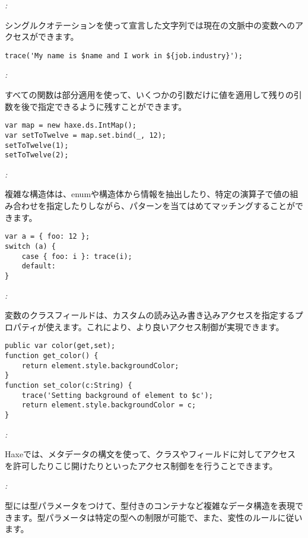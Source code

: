 \emph{:}

シングルクオテーションを使って宣言した文字列では現在の文脈中の変数へのアクセスができます。

\begin{lstlisting}
trace('My name is $name and I work in ${job.industry}');
\end{lstlisting}

\emph{:} 

すべての関数は部分適用を使って、いくつかの引数だけに値を適用して残りの引数を後で指定できるように残すことができます。

\begin{lstlisting}
var map = new haxe.ds.IntMap();
var setToTwelve = map.set.bind(_, 12);
setToTwelve(1);
setToTwelve(2);
\end{lstlisting}

\emph{:} 

複雑な構造体は、enumや構造体から情報を抽出したり、特定の演算子で値の組み合わせを指定したりしながら、パターンを当てはめてマッチングすることができます。

\begin{lstlisting}
var a = { foo: 12 };
switch (a) {
    case { foo: i }: trace(i);
    default:
}
\end{lstlisting}

\emph{:}

変数のクラスフィールドは、カスタムの読み込み書き込みアクセスを指定するプロパティが使えます。これにより、より良いアクセス制御が実現できます。

\begin{lstlisting}
public var color(get,set);
function get_color() {
    return element.style.backgroundColor;
}
function set_color(c:String) {
    trace('Setting background of element to $c');
    return element.style.backgroundColor = c;
}
\end{lstlisting}

\emph{:}

Haxeでは、メタデータの構文を使って、クラスやフィールドに対してアクセスを許可したりこじ開けたりといったアクセス制御をを行うことできます。

\emph{:}

型には型パラメータをつけて、型付きのコンテナなど複雑なデータ構造を表現できます。型パラメータは特定の型への制限が可能で、また、変性のルールに従います。

